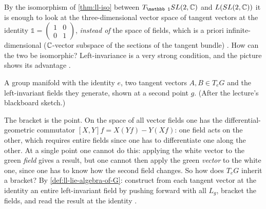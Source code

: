 \begin{paracol}{2}
By the isomorphism of \cref{thm:ll-iso} between $T_{\mathbb 1}SL(2,\C)$ and $L(SL(2,\mathbb{C}))$ it is enough to look at the three-dimensional vector space of tangent vectors at the identity $\mathbb 1=\begin{pmatrix}1&0\\0&1\end{pmatrix}$, \emph{instead of} the space of fields, which is a priori infinite-dimensional ($\mathbb{C}$-vector subspace of the sections of the tangent bundle)    . How can the two be isomorphic? Left-invariance is a very strong condition, and the picture shows its advantage  .
\begin{nfigure}
\caption{A group manifold with the identity $e$, two tangent vectors $A,B\in T_eG$ and the left-invariant fields they generate, shown at a second point $g$. (After the lecture's blackboard sketch.)}
\end{nfigure}
The bracket is the point. On the space of all vector fields one has the differential-geometric commutator $[X,Y]f=X(Yf)-Y(Xf)$: one field acts on the other, which requires entire fields since one has to differentiate one along the other. At a single point one cannot do this: applying the white vector to the green \emph{field} gives a result, but one cannot then apply the green \emph{vector} to the white one, since one has to know how the second field changes. So how does $T_eG$ inherit a bracket? By \cref{def:ll-lie-algebra-of-G}: construct from each tangent vector at the identity an entire left-invariant field by pushing forward with all $L_g$, bracket the fields, and read the result at the identity       .

\end{paracol}
